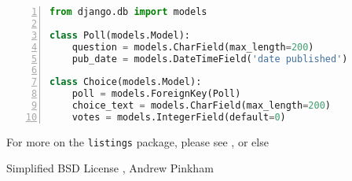 \noindent\minipage{\linewidth} %
\begin{lstlisting}[aboveskip=\baselineskip,%
                   basicstyle=\ttfamily,%
                   belowskip=\baselineskip,%
                   caption={models.py from Django Tutorial},%
                   columns=fixed,%
                   firstnumber=1,%
                   frame=single,%
                   label=code:django:models_basic,%
                   language=Python,%
                   numbers=left,%
                   showstringspaces=false,%
                   showspaces=false]
from django.db import models

class Poll(models.Model):
    question = models.CharField(max_length=200)
    pub_date = models.DateTimeField('date published')

class Choice(models.Model):
    poll = models.ForeignKey(Poll)
    choice_text = models.CharField(max_length=200)
    votes = models.IntegerField(default=0)
\end{lstlisting}
\endminipage %

For more on the \verb|listings| package, please see , or else 

\begin{center}
Simplified BSD License , Andrew Pinkham
 \end{center}


